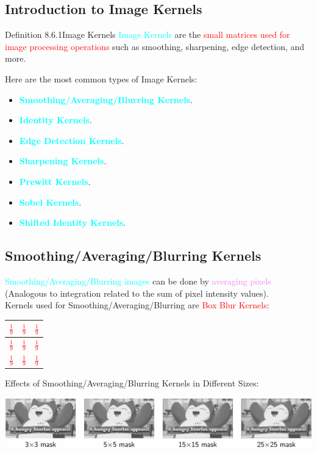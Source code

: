 \documentclass{book}
\begin{document}
\subsection{Introduction to Image Kernels}
\begin{defBox}{Definition 8.6.1}{Image Kernels}
    \textcolor{cyan}{Image Kernels} are the \textcolor{red}{small matrices used for image processing operations} such as smoothing, sharpening, edge detection, and more.
\end{defBox}
Here are the most common types of Image Kernels:
\begin{itemize}
    \item \textcolor{cyan}{\textbf{Smoothing/Averaging/Blurring Kernels}}.
    \item \textcolor{cyan}{\textbf{Identity Kernels}}.
    \item \textcolor{cyan}{\textbf{Edge Detection Kernels}}.
    \item \textcolor{cyan}{\textbf{Sharpening Kernels}}.
    \item \textcolor{cyan}{\textbf{Prewitt Kernels}}.
    \item \textcolor{cyan}{\textbf{Sobel Kernels}}.
    \item \textcolor{cyan}{\textbf{Shifted Identity Kernels}}.
\end{itemize}
\newpage
\subsection{Smoothing/Averaging/Blurring Kernels}

\textcolor{cyan}{Smoothing/Averaging/Blurring images} can be done by \textcolor{violet}{averaging pixels} (Analogous to integration related to the sum of pixel intensity values).\\
Kernels used for Smoothing/Averaging/Blurring are \textcolor{red}{Box Blur Kernels}:
\begin{center}
    \textcolor{red}{
    \begin{tabular}{|c|c|c|}
        \hline
        {\large $\frac{1}{9}$} & {\large $\frac{1}{9}$} & {\large $\frac{1}{9}$} \\
        \hline
        {\large $\frac{1}{9}$} & {\large $\frac{1}{9}$} & {\large $\frac{1}{9}$} \\
        \hline
        {\large $\frac{1}{9}$} & {\large $\frac{1}{9}$} & {\large $\frac{1}{9}$} \\
        \hline
    \end{tabular}}
\end{center}
Effects of Smoothing/Averaging/Blurring Kernels in Different Sizes:
\begin{center}
    \includegraphics[scale=0.27]{chapter 8/smoothing_kernel.jpeg}
\end{center}
\end{document}
